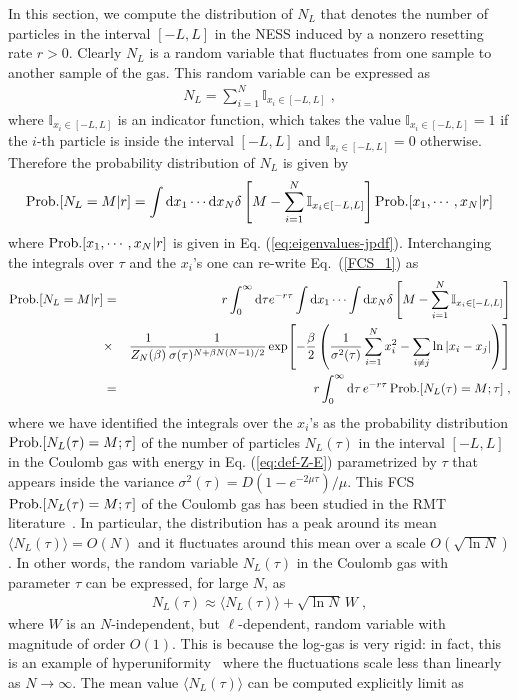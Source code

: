 \documentclass[onecolumn,superscriptaddress,
 amsmath,amssymb,
 aps,
 prd,
]{revtex4-1}
\newcommand{\bea}{\begin{eqnarray}}
\newcommand{\eea}{\end{eqnarray}}
\begin{document}
In this section, we compute the distribution of $N_L$ that denotes the number of particles in the  interval $[-L, L]$ in the NESS induced by a nonzero resetting rate $r>0$. Clearly $N_L$ is a random variable that fluctuates from one sample to another sample of the gas. This random variable can be expressed as 
\bea \label{indic}
N_L = \sum_{i=1}^N {\mathbb I}_{x_i \in [-L,L]} \;,
\eea
where ${\mathbb I}_{x_i \in [-L,L]}$ is an indicator function, which takes the value ${\mathbb I}_{x_i \in [-L,L]} = 1$ if the $i$-th particle is inside the interval $[-L,L]$ and ${\mathbb I}_{x_i \in [-L,L]} = 0$ otherwise. Therefore the probability distribution of $N_L$ is given by
\bea \label{FCS_1}
{\rm Prob.}[N_L = M \vert r] = \int \dd x_1 \cdots \dd x_N \delta \left[ M - \sum_{i=1}^N {\mathbb I}_{x_i \in [-L,L]} \right] {\rm Prob.}[x_1, \cdots, x_N \vert r]
\eea
where $ {\rm Prob.}[x_1, \cdots, x_N \vert r]$ is given in Eq. (\ref{eq:eigenvalues-jpdf}). Interchanging the integrals over $\tau$ and the $x_i$'s one can re-write Eq.~(\ref{FCS_1}) as
\bea \label{FCS_2}
{\rm Prob.}[N_L = M \vert r] &=& r\int_0^\infty \dd \tau  e^{-r \tau} \int \dd x_1 \cdots \int \dd x_N \delta\left[M -  \sum_{i=1}^N {\mathbb I}_{x_i \in [-L,L]}\right]\nonumber \\
&\times& \frac{1}{Z_N(\beta)} \frac{1}{\sigma(\tau)^{N + \beta N(N-1)/2}} \exp[ -\frac{\beta}{2}\left(\frac{1}{\sigma^2(\tau)} \sum_{i = 1}^N x_i^2 - \sum_{i \neq j} \ln |x_i - x_j| \right)] \nonumber \\
&=&   r\int_0^\infty \dd \tau  \,e^{-r \tau} \, {\rm Prob.}[N_L(\tau) = M ; \tau] \;,
\eea  
where we have identified the integrals over the $x_i$'s as the probability distribution ${\rm Prob.}[N_L(\tau) = M ; \tau]$ of the number of particles $N_L(\tau)$ in the interval $[-L,L]$ in the Coulomb gas with energy in Eq. (\ref{eq:def-Z-E}) parametrized by $\tau$ that appears inside the variance $\sigma^2(\tau) = D(1-e^{-2 \mu \tau})/\mu$. This FCS ${\rm Prob.}[N_L(\tau) = M ; \tau]$ of the Coulomb gas has been studied in the RMT literature~\cite{DM63,CL95,FS95,MMSV14,CLM15,MMSV16}. In particular, the distribution has a peak around its mean $\langle N_L(\tau)\rangle = O(N)$ and it fluctuates around this mean over a scale $O(\sqrt{\ln N})$. In other words, the random variable $N_L(\tau)$ in the Coulomb gas with parameter $\tau$ can be expressed, for large $N$, as 
\bea \label{FCS_3}
N_L(\tau) \approx \langle N_L(\tau)\rangle + \sqrt{\ln N} \, W \;,
\eea
where $W$ is an $N$-independent, but $\ell$-dependent, random variable with magnitude of order $O(1)$. This is because the log-gas is very rigid: in fact, this is an example of hyperuniformity~\cite{T18} where the fluctuations scale less than linearly as $N \to \infty$. The mean value $ \langle N_L(\tau)\rangle$ can be computed explicitly limit as
\end{document}
